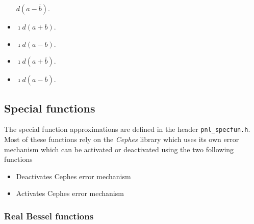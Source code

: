 \begin{itemize}
  \sshortdescribe $ d\left(a-\overline{b}\right)  $.
\item {}
  \sshortdescribe $\imath d\left(a+b\right) $.
\item {}
  \sshortdescribe $\imath  d\left(a-b\right) $.
\item {}
  \sshortdescribe $ \imath d\left(a+\overline{b}\right) $.
\item {}
  \sshortdescribe $ \imath  d\left(a-\overline{b}\right) $.
\end{itemize}




\subsection{Special functions}

The special function approximations are defined in the header \verb!pnl_specfun.h!.\\

Most of these functions rely on the {\it Cephes} library which uses its own
error mechanism which can be activated or deactivated using the two following
functions
\begin{itemize}
  \item {}
    \sshortdescribe Deactivates Cephes error mechanism
  \item {}
    \sshortdescribe Activates Cephes error mechanism
\end{itemize}


\subsubsection{Real Bessel functions}

